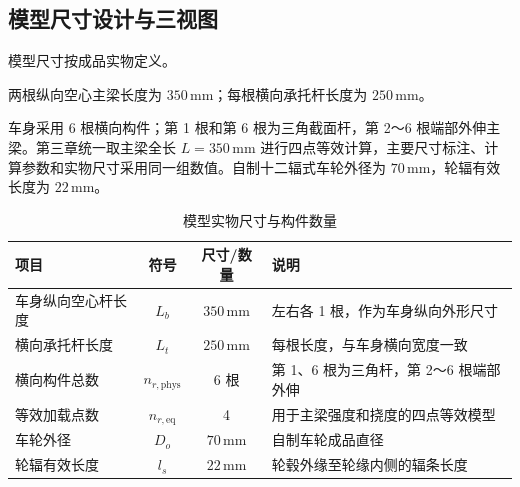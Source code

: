 \documentclass[UTF8,a4paper,12pt,fontset=none]{ctexart}
\numberwithin{equation}{section}
\numberwithin{figure}{section}
\numberwithin{table}{section}
\newcommand{\mm}{\,\mathrm{mm}}
\begin{document}
\subsection{模型尺寸设计与三视图}
模型尺寸按成品实物定义。

两根纵向空心主梁长度为 $350\mm$；每根横向承托杆长度为 $250\mm$。

车身采用 6 根横向构件；第 1 根和第 6 根为三角截面杆，第 2～6 根端部外伸主梁。第三章统一取主梁全长 $L=350\mm$ 进行四点等效计算，主要尺寸标注、计算参数和实物尺寸采用同一组数值。自制十二辐式车轮外径为 $70\mm$，轮辐有效长度为 $22\mm$。

\begin{table}[H]
\centering
\caption{模型实物尺寸与构件数量}
\label{tab:model-dimensions}
\begin{tabularx}{\linewidth}{Y c c Y}
\toprule
\textbf{项目} & \textbf{符号} & \textbf{尺寸/数量} & \textbf{说明} \\\midrule
车身纵向空心杆长度 & $L_b$ & $350\mm$ & 左右各 1 根，作为车身纵向外形尺寸 \\
横向承托杆长度 & $L_t$ & $250\mm$ & 每根长度，与车身横向宽度一致 \\
横向构件总数 & $n_{r,\mathrm{phys}}$ & 6 根 & 第 1、6 根为三角杆，第 2～6 根端部外伸 \\
等效加载点数 & $n_{r,\mathrm{eq}}$ & 4 & 用于主梁强度和挠度的四点等效模型 \\
车轮外径 & $D_o$ & $70\mm$ & 自制车轮成品直径 \\
轮辐有效长度 & $l_s$ & $22\mm$ & 轮毂外缘至轮缘内侧的辐条长度 \\
\bottomrule
\end{tabularx}
\end{table}
\end{document}
